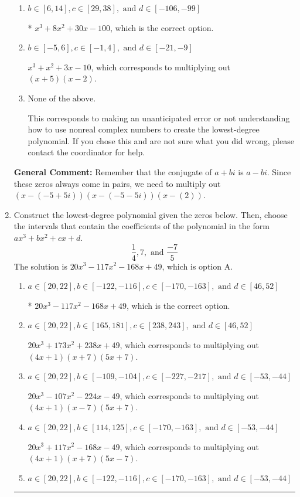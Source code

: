 \documentclass{extbook}[14pt]
\newcommand{\litem}[1]{\item #1

\rule{\textwidth}{0.4pt}}
\begin{document}
\begin{enumerate}
{\begin{enumerate}[label=\Alph*.]
$x^{3} -8 x^{2} +30 x + 100$, which corresponds to multiplying out $(x-(-5 + 5 i))(x-(-5 - 5 i))(x + 2)$.
\item \( b \in [6, 14], c \in [29, 38], \text{ and } d \in [-106, -99] \)

* $x^{3} +8 x^{2} +30 x -100$, which is the correct option.
\item \( b \in [-5, 6], c \in [-1, 4], \text{ and } d \in [-21, -9] \)

$x^{3} + x^{2} +3 x -10$, which corresponds to multiplying out $(x + 5)(x -2)$.
\item \( \text{None of the above.} \)

This corresponds to making an unanticipated error or not understanding how to use nonreal complex numbers to create the lowest-degree polynomial. If you chose this and are not sure what you did wrong, please contact the coordinator for help.
\end{enumerate}

\textbf{General Comment:} Remember that the conjugate of $a+bi$ is $a-bi$. Since these zeros always come in pairs, we need to multiply out $(x-(-5 + 5 i))(x-(-5 - 5 i))(x-(2))$.
}
\litem{
Construct the lowest-degree polynomial given the zeros below. Then, choose the intervals that contain the coefficients of the polynomial in the form $ax^3+bx^2+cx+d$.
\[ \frac{1}{4}, 7, \text{ and } \frac{-7}{5} \]The solution is \( 20x^{3} -117 x^{2} -168 x + 49 \), which is option A.\begin{enumerate}[label=\Alph*.]
\item \( a \in [20, 22], b \in [-122, -116], c \in [-170, -163], \text{ and } d \in [46, 52] \)

* $20x^{3} -117 x^{2} -168 x + 49$, which is the correct option.
\item \( a \in [20, 22], b \in [165, 181], c \in [238, 243], \text{ and } d \in [46, 52] \)

$20x^{3} +173 x^{2} +238 x + 49$, which corresponds to multiplying out $(4x + 1)(x + 7)(5x + 7)$.
\item \( a \in [20, 22], b \in [-109, -104], c \in [-227, -217], \text{ and } d \in [-53, -44] \)

$20x^{3} -107 x^{2} -224 x -49$, which corresponds to multiplying out $(4x + 1)(x -7)(5x + 7)$.
\item \( a \in [20, 22], b \in [114, 125], c \in [-170, -163], \text{ and } d \in [-53, -44] \)

$20x^{3} +117 x^{2} -168 x -49$, which corresponds to multiplying out $(4x + 1)(x + 7)(5x -7)$.
\item \( a \in [20, 22], b \in [-122, -116], c \in [-170, -163], \text{ and } d \in [-53, -44] \)


\end{enumerate}}
\end{enumerate}
\end{document}
